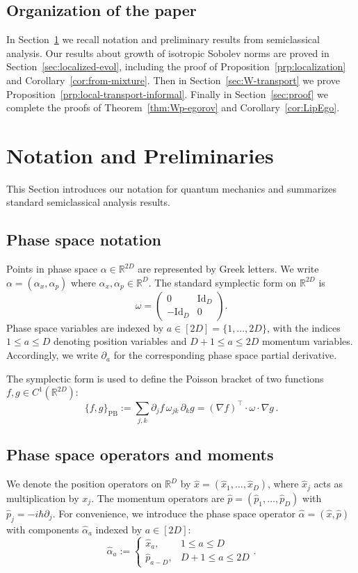 \documentclass[11pt]{amsart}
\def\Id{\mathrm{Id}}
\def\Real{{\mathbb R}}
\numberwithin{equation}{section}
\begin{document}
\subsection{Organization of the paper}
In Section~\ref{sec:notation} we recall notation and preliminary results from semiclassical analysis.
Our results about growth of isotropic Sobolev norms are proved in Section~\ref{sec:localized-evol}, including the proof of Proposition~\ref{prp:localization} and Corollary~\ref{cor:from-mixture}.  Then in Section~\ref{sec:W-transport} we prove Proposition~\ref{prp:local-transport-informal}.  Finally in Section~\ref{sec:proof}
we complete the proofs of Theorem~\ref{thm:Wp-egorov} and Corollary~\ref{cor:LipEgo}.

\section{Notation and Preliminaries}
\label{sec:notation}

This Section introduces our notation for quantum mechanics and summarizes standard semiclassical analysis results.

\subsection{Phase space notation}
Points in phase space $\alpha\in\Real^{2D}$ are represented by Greek letters.  We write $\alpha=(\alpha_x,\alpha_p)$ where
$\alpha_x,\alpha_p\in\Real^D$.  The standard symplectic form on $\Real^{2D}$ is
\[
\omega = \begin{pmatrix}0 & \Id_{D} \\ -\Id_D & 0\end{pmatrix}.
\]
Phase space variables are indexed by $a\in[2D] = \{1,...,2D\}$, with the indices $1\leq a\leq D$ denoting position variables and $D+1\leq a\leq 2D$ momentum variables.  Accordingly, we write $\partial_a$ for the corresponding phase space partial derivative.

The symplectic form is used to define the Poisson bracket of two functions $f,g\in C^1(\Real^{2D})$:
\[
\{f,g\}_{\text{PB}} := \sum_{j,k} \partial_j f \,\omega_{jk}\, \partial_k g = (\nabla f)^\intercal \cdot \omega \cdot \nabla g\,.
\]

\subsection{Phase space operators and moments}

We denote the position operators on $\mathbb{R}^D$ by $\hat{x} = (\hat{x}_1,\ldots,\hat{x}_D)$, where $\hat{x}_j$ acts as multiplication by $x_j$. The momentum operators are $\hat{p} = (\hat{p}_1,\ldots,\hat{p}_D)$ with $\hat{p}_j = -i\hbar \partial_j$. For convenience, we introduce the phase space operator $\hat{\alpha} = (\hat{x},\hat{p})$ with components $\hat{\alpha}_a$ indexed by $a\in[2D]$:
\[
\hat{\alpha}_a :=
\begin{cases}
\hat{x}_a, &1\leq a\leq D \\
\hat{p}_{a-D}, &D+1\leq a\leq 2D
\end{cases}.
\]
\end{document}
